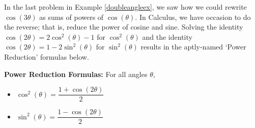 In the last problem in Example \ref{doubleangleex}, we saw how we could rewrite $\cos(3\theta)$ as sums of powers of  $\cos(\theta)$.  In Calculus, we have occasion to do the reverse;  that is, reduce the power of cosine and sine. Solving the identity $\cos(2\theta) = 2\cos^{2}(\theta) -1$ for $\cos^{2}(\theta)$  and the identity $\cos(2\theta) = 1 - 2\sin^{2}(\theta)$ for $\sin^{2}(\theta)$ results in the aptly-named `Power Reduction' formulas below.  

\smallskip

\colorbox{ResultColor}{\bbm

\begin{thm} \label{powerreduction}  \textbf{Power Reduction Formulas:} For all angles $\theta$, 

\begin{itemize}

\item  $\cos^{2}(\theta) = \dfrac{1 + \cos(2\theta)}{2}$

\item  $\sin^{2}(\theta) = \dfrac{1 - \cos(2\theta)}{2}$

\end{itemize}

\end{thm}

\ebm}

\smallskip

